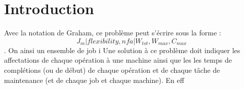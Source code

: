 \documentclass[10pt,a4paper]{scrartcl}
\begin{document}
\section{Introduction}

Avec la notation de Graham, ce problème peut s'écrire sous la forme : 
\[J_{m}|flexibility,nfa|W_{tot},W_{max},C_{max}\].
On ainsi un ensemble de job i
Une solution à ce problème doit indiquer les affectations de chaque opération à une machine ainsi
que les les temps de complétions (ou de début) de chaque opération
et de chaque tâche de maintenance (et de chaque job et chaque machine).
En eff
%
%    
%     
%     
%     
%     
%     
%    
%        
%        
\end{document}

